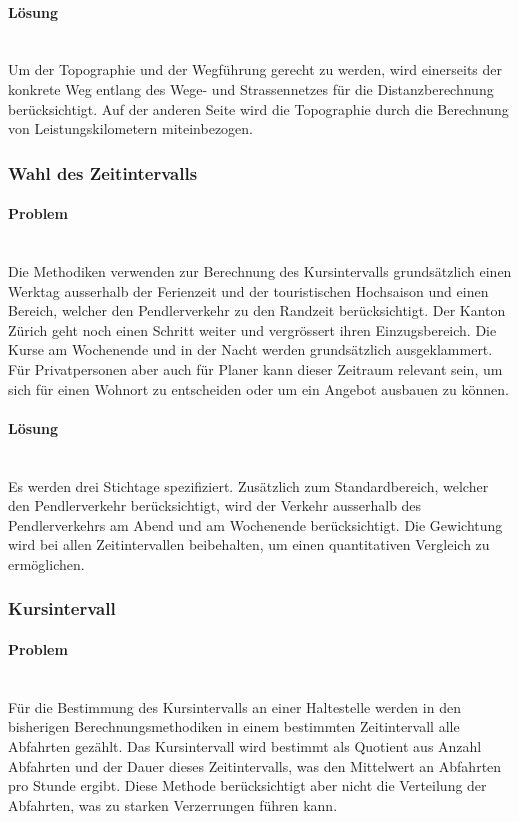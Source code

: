 \paragraph{Lösung}~\\
Um der Topographie und der Wegführung gerecht zu werden, wird einerseits der konkrete Weg entlang des Wege- und Strassennetzes für die Distanzberechnung berücksichtigt.
Auf der anderen Seite wird die Topographie durch die Berechnung von \gls{Leistungskilometer}n miteinbezogen.

\subsubsection{Wahl des Zeitintervalls}
\label{Verbesserungsmöglichkeiten:Wahl des Zeitintervalls}

\paragraph{Problem}~\\
Die Methodiken verwenden zur Berechnung des Kursintervalls grundsätzlich einen Werktag ausserhalb der Ferienzeit und der touristischen Hochsaison und einen Bereich, welcher den Pendlerverkehr zu den Randzeit berücksichtigt.
Der Kanton Zürich geht noch einen Schritt weiter und vergrössert ihren Einzugsbereich.
Die Kurse am Wochenende und in der Nacht werden grundsätzlich ausgeklammert.
Für Privatpersonen aber auch für Planer kann dieser Zeitraum relevant sein, um sich für einen Wohnort zu entscheiden oder um ein Angebot ausbauen zu können.

\paragraph{Lösung}~\\
Es werden drei Stichtage spezifiziert.
Zusätzlich zum Standardbereich, welcher den Pendlerverkehr berücksichtigt, wird der Verkehr ausserhalb des Pendlerverkehrs am Abend und am Wochenende berücksichtigt.
Die Gewichtung wird bei allen Zeitintervallen beibehalten, um einen quantitativen Vergleich zu ermöglichen.

\subsubsection{Kursintervall}
\label{Verbesserungsmöglichkeiten:Kursintervall}

\paragraph{Problem}~\\
Für die Bestimmung des Kursintervalls an einer Haltestelle werden in den bisherigen Berechnungsmethodiken in einem bestimmten Zeitintervall alle Abfahrten gezählt. Das Kursintervall wird bestimmt als Quotient aus Anzahl Abfahrten und der Dauer dieses Zeitintervalls, was den Mittelwert an Abfahrten pro Stunde ergibt.
Diese Methode berücksichtigt aber nicht die Verteilung der Abfahrten, was zu starken Verzerrungen führen kann.


